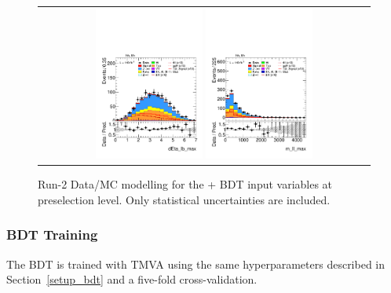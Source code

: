 \begin{figure}[htbp]
\begin{tabular}{@{}c c c@{}}
    \multicolumn{3}{c}{%
      \includegraphics[width=0.33\textwidth]{images/plots_modelling_run2_run3_variables/run_2_tth/plot_dEta_lb_max_hh_tth_15_16_17_18.pdf}%
      \hspace{1.5pt}%
      \includegraphics[width=0.33\textwidth]{images/plots_modelling_run2_run3_variables/run_2_tth/plot_m_ll_max_hh_tth_15_16_17_18.pdf}%
    }\\
  \end{tabular}

  \caption{Run-2 Data/MC modelling for the \thqb + \ttH BDT input variables at preselection level. Only statistical uncertainties are included.}
  \label{tth_vars_modelling_run2_3}
\end{figure}

\FloatBarrier
\subsubsection*{BDT Training }

The BDT is trained with \textsc{TMVA} using the same hyperparameters described in Section~\ref{setup_bdt} and a five-fold cross-validation.

